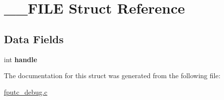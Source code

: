 \hypertarget{struct_____f_i_l_e}{\section{\-\_\-\-\_\-\-F\-I\-L\-E Struct Reference}
\label{struct_____f_i_l_e}
}
\subsection*{Data Fields}
\begin{DoxyCompactItemize}
\item 
\hypertarget{struct_____f_i_l_e_a3127ebf018e9da62fa464d348352037d}{int {\bfseries handle}}\label{struct_____f_i_l_e_a3127ebf018e9da62fa464d348352037d}

\end{DoxyCompactItemize}


The documentation for this struct was generated from the following file\-:\begin{DoxyCompactItemize}
\item 
\hyperlink{fputc__debug_8c}{fputc\-\_\-debug.\-c}\end{DoxyCompactItemize}
